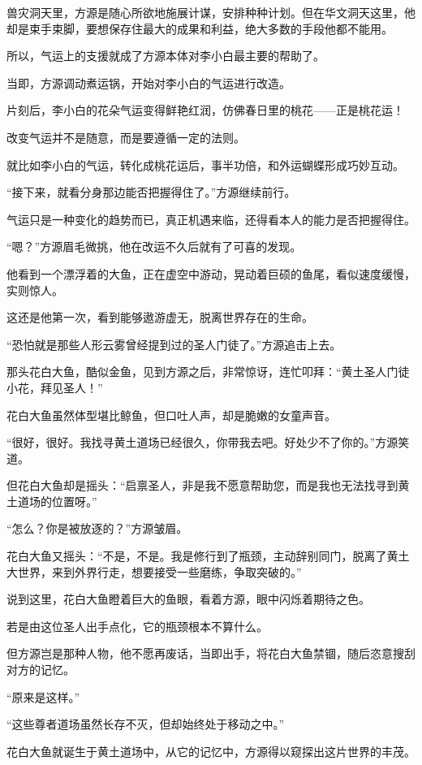 \begin{this_body}
兽灾洞天里，方源是随心所欲地施展计谋，安排种种计划。但在华文洞天这里，他却是束手束脚，要想保存住最大的成果和利益，绝大多数的手段他都不能用。

所以，气运上的支援就成了方源本体对李小白最主要的帮助了。

当即，方源调动煮运锅，开始对李小白的气运进行改造。

片刻后，李小白的花朵气运变得鲜艳红润，仿佛春日里的桃花——正是桃花运！

改变气运并不是随意，而是要遵循一定的法则。

就比如李小白的气运，转化成桃花运后，事半功倍，和外运蝴蝶形成巧妙互动。

“接下来，就看分身那边能否把握得住了。”方源继续前行。

气运只是一种变化的趋势而已，真正机遇来临，还得看本人的能力是否把握得住。

“嗯？”方源眉毛微挑，他在改运不久后就有了可喜的发现。

他看到一个漂浮着的大鱼，正在虚空中游动，晃动着巨硕的鱼尾，看似速度缓慢，实则惊人。

这还是他第一次，看到能够遨游虚无，脱离世界存在的生命。

“恐怕就是那些人形云雾曾经提到过的圣人门徒了。”方源追击上去。

那头花白大鱼，酷似金鱼，见到方源之后，非常惊讶，连忙叩拜：“黄土圣人门徒小花，拜见圣人！”

花白大鱼虽然体型堪比鲸鱼，但口吐人声，却是脆嫩的女童声音。

“很好，很好。我找寻黄土道场已经很久，你带我去吧。好处少不了你的。”方源笑道。

但花白大鱼却是摇头：“启禀圣人，非是我不愿意帮助您，而是我也无法找寻到黄土道场的位置呀。”

“怎么？你是被放逐的？”方源皱眉。

花白大鱼又摇头：“不是，不是。我是修行到了瓶颈，主动辞别同门，脱离了黄土大世界，来到外界行走，想要接受一些磨练，争取突破的。”

说到这里，花白大鱼瞪着巨大的鱼眼，看着方源，眼中闪烁着期待之色。

若是由这位圣人出手点化，它的瓶颈根本不算什么。

但方源岂是那种人物，他不愿再废话，当即出手，将花白大鱼禁锢，随后恣意搜刮对方的记忆。

“原来是这样。”

“这些尊者道场虽然长存不灭，但却始终处于移动之中。”

花白大鱼就诞生于黄土道场中，从它的记忆中，方源得以窥探出这片世界的丰茂。


\end{this_body}
